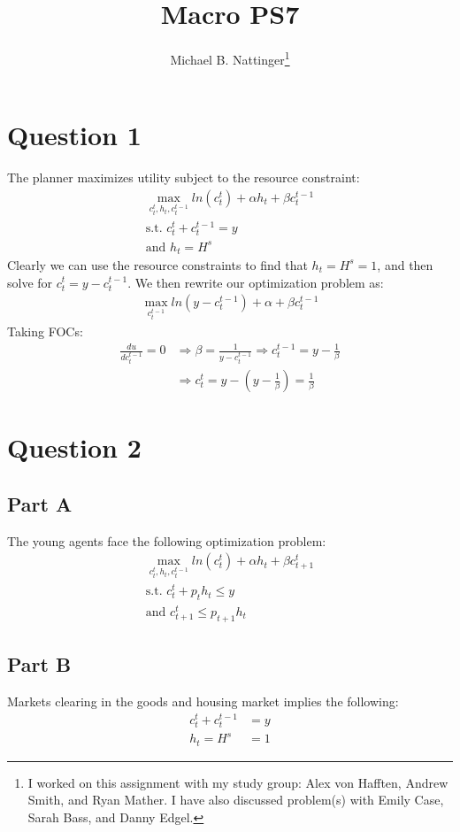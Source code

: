 \documentclass[11pt]{article} %
\title{Macro PS7}
\author{Michael B. Nattinger\footnote{I worked on this assignment with my study group: Alex von Hafften, Andrew Smith, and Ryan Mather. I have also discussed problem(s) with Emily Case, Sarah Bass, and Danny Edgel.}}
\begin{document}
\maketitle

\section{Question 1}
The planner maximizes utility subject to the resource constraint:
\begin{align*}
\max_{c_t^t,h_t,c_{t}^{t-1}} ln(c_t^t) + \alpha h_t + \beta c_{t}^{t-1}\\
\text{s.t. } c_t^t + c_{t}^{t-1} = y\\
\text{and } h_t = H^s
\end{align*}
Clearly we can use the resource constraints to find that $h_t = H^s =1$, and then solve for $c_t^t = y - c_t^{t-1}.$ We then rewrite our optimization problem as:
\begin{align*}
\max_{c_{t}^{t-1}} ln(y - c_t^{t-1}) + \alpha  + \beta c_{t}^{t-1}
\end{align*}
Taking FOCs:
\begin{align*}
\frac{d u}{dc_t^{t-1}} = 0 &\Rightarrow \beta = \frac{1}{y-c_t^{t-1}} \Rightarrow c_{t}^{t-1} = y - \frac{1}{\beta}\\
&\Rightarrow c_t^t = y - (y - \frac{1}{\beta}) =  \frac{1}{\beta}
\end{align*}
\section{Question 2}
\subsection{Part A}
The young agents face the following optimization problem:
\begin{align*}
\max_{c_t^t,h_t,c_{t}^{t-1}} ln(c_t^t) + \alpha h_t + \beta c_{t+1}^{t}\\
\text{s.t. } c_t^t + p_t h_t \leq y\\
\text{and } c_{t+1}^t \leq p_{t+1}h_{t}
\end{align*}

\subsection{Part B}

Markets clearing in the goods and housing market implies the following:
\begin{align*}
c_t^t + c_{t}^{t-1} &= y\\
h_t = H^s &= 1
\end{align*}
\end{document}
